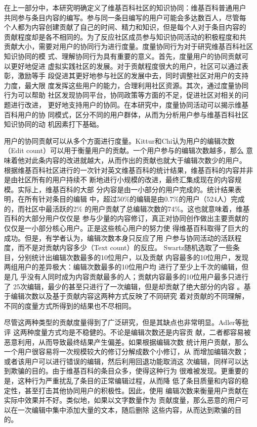 在上一部分中，本研究明确定义了维基百科社区的知识协同：维基百科普通用户
共同参与条目内容的编写。参与同一条目编写的用户可能会多达数百人，尽管每
个人都为内容创建贡献了自己的时间、精力和知识，但是每个人对于条目内容的
贡献程度却是各不相同的。为了反应社区成员参与知识协同活动的积极程度和共
贡献大小，需要对用户的协同行为进行度量。度量协同行为对于研究维基百科社区知识协同的模
式、理解协同行为具有重要的意义。首先，度量用户的协同贡献可以更好地促进
虚拟实践社区的发展。对于贡献程度很大的用户，社区可以通过表彰，激励等手
段促进其更好地参与社区的发展中去，同时调整社区对用户的支持力度，最大限
度发挥这些用户的能力，合理利用社区资源。其次，通过度量协同行为可以帮助
社区发现协同平台，协同政策等方面的不足，促进社区对相关的问题进行改进，
更好地支持用户的协同。在本研究中，度量协同活动可以揭示维基百科用户的协
同模式，区分不同的用户群体，从而为分析用户参与维基百科社区知识协同的动
机因素打下基础。

用户的协同贡献可以从多个方面进行度量。Kittur和Chi认为用户的编辑次数
（Edit count）可以用于衡量用户的贡献\cite{Kittur2007}。一个用户参与的编辑次数越多，那么
意味着他对此条内容的改进就越大，从而作出的贡献也就大于编辑次数少的用户。
根据维基百科社区进行的一次针对英文维基百科的统计结果，维基百科的内容并非是由社区所有的用户持续不
断地进行小规模的改进，最终汇集成现在的内容规模。实际上，维基百科的大部
分内容是由一小部分的用户完成的。统计结果表明，在所有针对条目的编辑
中，超过50\%的编辑是由0.7\%的用户（524人）完成的，而社区中最活跃的2\%
的用户贡献了总编辑次数的74\%。这也就意味着，维基百科的大部分用户仅仅是
参与少量的内容修订，真正对协同创作做出主要贡献的仅仅是一小部分核心用户。正是这些核心用户的努力使
 得维基百科取得了巨大的成功。但是，有学者认为，编辑次数本身只反应了用
 户参与协同活动的活跃程度，而不是对贡献内容多少（Text count）的反应。
 Swartz随机选取了一些条目，分别统计出编辑次数最多的10位用户，以及贡献
 内容最多的10位用户，发现两组用户的差异极大：编辑次数最多的10位用户均
 进行了至少上千次的编辑，但是几
 乎没有人同时成为内容贡献最多的人；贡献内容最多的10位用户最多只进行了
 25次编辑，最少的甚至只进行了一次编辑，但是却贡献了绝大部分的内容
 \cite{aswartz}。基于编辑次数以及基于贡献内容这两种方式反映了不同研究
 着对贡献的不同理解，不同的度量方式所得到的结果也不尽相同。

尽管这两种类型的贡献度量得到了广泛研究，但是其缺点也非常明显。Adler等批评
 这两种度量方式均是不稳健的\cite{Adler2008}。不论是编辑次数还是内容贡
 献，二者都容易被恶意利用，从而导致最终结果产生偏差。如果根据编辑次数
 统计用户贡献，那么一个用户很容易将一次规模较大的修订分解成数个小修订，从
 而增加编辑次数；或者该用户可以进行错误的编辑，然后利用回退功能取消这
 次编辑，同样可以达到欺骗的目的。由于维基百科的条目众多，使得这种行为
 很难被发现。更重要的是，这种行为严重扰乱了条目的正常编辑过程，从而降
 低了条目质量和内容的稳定性，甚至打击其他协同用户的积极性。因此，使用
 编辑次数来衡量用户贡献在实际中效果并不好。类似地，如果以文字数量作为
 贡献度量，那么恶意的用户可以在一次编辑中集中添加大量的文本，随后删除
 这些内容，从而达到欺骗的目的。

